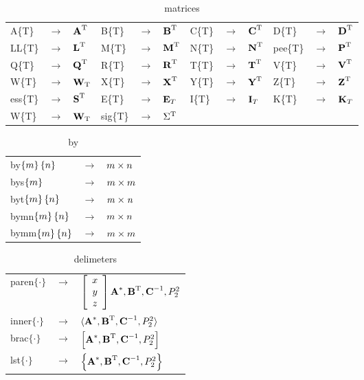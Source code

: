 \begin{table}[htdp]
\begin{center}
\begin{tabular}{lcllcllcllcl}
  A\{T\} & $\to$ & $\A{T}$ & B\{T\} & $\to$ & $\B{T}$ & C\{T\} & $\to$ & $\C{T}$ & D\{T\} & $\to$ & $\D{T}$\\
  LL\{T\} & $\to$ & $\LL{T}$ & M\{T\} & $\to$ & $\M{T}$ & N\{T\} & $\to$ & $\N{T}$ & pee\{T\} & $\to$ & $\pee{T}$\\
  Q\{T\} & $\to$ & $\Q{T}$ & R\{T\} & $\to$ & $\R{T}$ & T\{T\} & $\to$ & $\T{T}$ & V\{T\} & $\to$ & $\V{T}$\\
  W\{T\} & $\to$ & $\W{T}$ & X\{T\} & $\to$ & $\X{T}$ & Y\{T\} & $\to$ & $\Y{T}$ & Z\{T\} & $\to$ & $\Z{T}$\\
  ess\{T\} & $\to$ & $\ess{T}$ & E\{T\} & $\to$ & $\E{T}$ & I\{T\} & $\to$ & $\I{T}$ & K\{T\} & $\to$ & $\K{T}$\\
  W\{T\} & $\to$ & $\W{T}$ & sig\{T\} & $\to$ & $\sig{T}$\\
\end{tabular}
\end{center}
\caption{matrices}
\end{table}%

\begin{table}[htdp]
\begin{center}
\begin{tabular}{lcl}
  by$\lst{m}\lst{n}$   & $\to$ & $\by{m}{n}$\\
  bys$\lst{m}$         & $\to$ & $\bys{m}$\\
  byt$\lst{m}\lst{n}$  & $\to$ & $\byt{m}{n}$\\
  bymn$\lst{m}\lst{n}$ & $\to$ & $\bymn$\\
  bymm$\lst{m}\lst{n}$ & $\to$ & $\bymm$\\
\end{tabular}
\end{center}
\caption{by}
\end{table}%

\begin{table}[htdp]
\begin{center}
\begin{tabular}{lcl}
  paren$\{\cdot\}$ & $\to$ & $\xthree{\A{*},\B{T},\C{-1},P^{2}_{2}}$\\
  inner$\{\cdot\}$ & $\to$ & $\inner{\A{*},\B{T},\C{-1},P^{2}_{2}}$\\
  brac$\{\cdot\}$  & $\to$ & $\brac{\A{*},\B{T},\C{-1},P^{2}_{2}}$\\
  lst$\{\cdot\}$   & $\to$ & $\lst{\A{*},\B{T},\C{-1},P^{2}_{2}}$\\
\end{tabular}
\end{center}
\caption{delimeters}
\end{table}%

